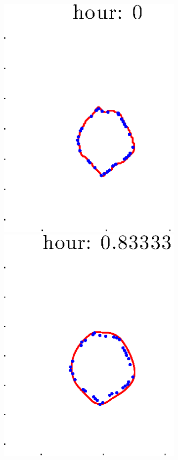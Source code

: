 \documentclass[12pt]{article}
\begin{document}
\begin{figure}[h!]
\begin{subfigure}[b]{.3\textwidth}
	\end{subfigure}
	\begin{subfigure}[b]{.3\textwidth}
	\centering
		\includegraphics[height=.15\textheight]{Pos14exp8/firsthalf/first1.eps}
		\includegraphics[height=.15\textheight]{Pos14exp8/firsthalf/first2.eps}

\end{subfigure}
\end{figure}
\end{document}
